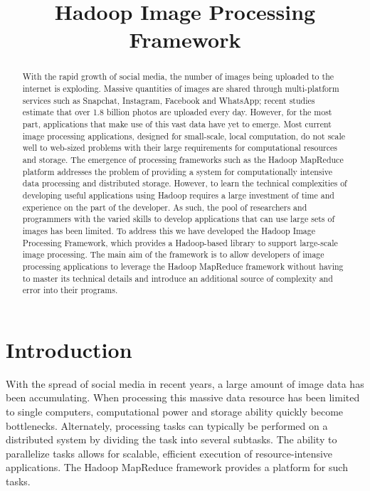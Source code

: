 \documentclass[conference]{IEEEtran}
\begin{document}
\title{Hadoop Image Processing Framework}
\author{
  \and
}
\maketitle
\begin{abstract}
With the rapid growth of social media, the number of images being
uploaded to the internet is exploding. Massive quantities of images
are shared through multi-platform services such as Snapchat,
Instagram, Facebook and WhatsApp; recent studies estimate that over
1.8 billion photos are uploaded every day.  However, for the most
part, applications that make use of this vast data have yet to
emerge. Most current image processing applications, designed for
small-scale, local computation, do not scale well to web-sized
problems with their large requirements for computational resources and
storage.  The emergence of processing frameworks such as the Hadoop
MapReduce\cite{dean2008} platform addresses the problem of providing
a system for computationally intensive data processing and distributed
storage. However, to learn the technical complexities of developing
useful applications using Hadoop requires a large investment of time
and experience on the part of the developer.  As such, the pool of
researchers and programmers with the varied skills to develop
applications that can use large sets of images has been limited. To
address this we have developed the Hadoop Image Processing Framework,
which provides a Hadoop-based library to support large-scale image
processing. The main aim of the framework is to allow developers of
image processing applications to leverage the Hadoop MapReduce
framework without having to master its technical details and introduce
an additional source of complexity and error into their programs.
\end{abstract}
	
\IEEEpeerreviewmaketitle
	
\section{Introduction}
With the spread of social media in recent years, a large amount of
image data has been accumulating. When processing this massive data
resource has been limited to single computers, computational power and
storage ability quickly become bottlenecks. Alternately, processing
tasks can typically be performed on a distributed system by dividing
the task into several subtasks. The ability to parallelize tasks
allows for scalable, efficient execution of resource-intensive
applications.  The Hadoop MapReduce framework provides a platform for
such tasks.
	
\end{document}
